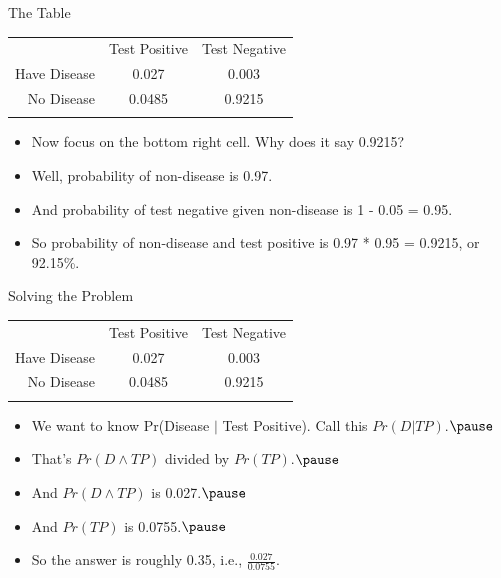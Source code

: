 \documentclass[
  ignorenonframetext,
]{beamer}
\providecommand{\tightlist}{%
  \setlength{\itemsep}{0pt}\setlength{\parskip}{0pt}}
\renewcommand{\,}{\text{, }}
\begin{document}
\begin{frame}{The Table}
\protect\hypertarget{the-table-4}{}
\begin{longtable}[]{@{}rcc@{}}
\toprule
& Test Positive & Test Negative \\ \addlinespace
\midrule
\endhead
Have Disease & 0.027 & 0.003 \\ \addlinespace
No Disease & 0.0485 & 0.9215 \\ \addlinespace
\bottomrule
\end{longtable}

\begin{itemize}
\tightlist
\item
  Now focus on the bottom right cell. Why does it say 0.9215?
\item
  Well, probability of non-disease is 0.97.
\item
  And probability of test negative given non-disease is 1 - 0.05 = 0.95.
\item
  So probability of non-disease and test positive is 0.97 * 0.95 =
  0.9215, or 92.15\%.
\end{itemize}
\end{frame}

\begin{frame}{Solving the Problem}
\protect\hypertarget{solving-the-problem}{}
\begin{longtable}[]{@{}rcc@{}}
\toprule
& Test Positive & Test Negative \\ \addlinespace
\midrule
\endhead
Have Disease & 0.027 & 0.003 \\ \addlinespace
No Disease & 0.0485 & 0.9215 \\ \addlinespace
\bottomrule
\end{longtable}

\begin{itemize}
\tightlist
\item
  We want to know Pr(Disease \(|\) Test Positive). Call this
  \(Pr(D | TP)\).\(\pause\)
\item
  That's \(Pr(D \wedge TP)\) divided by \(Pr(TP)\).\(\pause\)
\item
  And \(Pr(D \wedge TP)\) is 0.027.\(\pause\)
\item
  And \(Pr(TP)\) is 0.0755.\(\pause\)
\item
  So the answer is roughly 0.35, i.e., \(\frac{0.027}{0.0755}\).
\end{itemize}
\end{frame}
\end{document}
